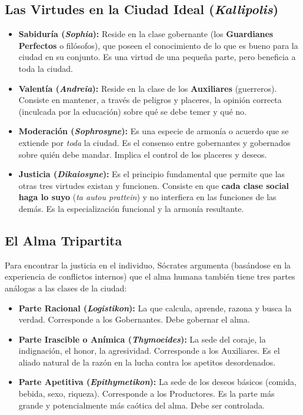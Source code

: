 \documentclass[11pt, a4paper]{article}
\begin{document}
\subsection*{Las Virtudes en la Ciudad Ideal (\textit{Kallipolis})}
\begin{itemize}
    \item \textbf{Sabiduría (\textit{Sophia}):} Reside en la clase gobernante (los \textbf{Guardianes Perfectos} o filósofos), que poseen el conocimiento de lo que es bueno para la ciudad en su conjunto. Es una virtud de una pequeña parte, pero beneficia a toda la ciudad.
    \item \textbf{Valentía (\textit{Andreia}):} Reside en la clase de los \textbf{Auxiliares} (guerreros). Consiste en mantener, a través de peligros y placeres, la opinión correcta (inculcada por la educación) sobre qué se debe temer y qué no.
    \item \textbf{Moderación (\textit{Sophrosyne}):} Es una especie de armonía o acuerdo que se extiende por \textit{toda} la ciudad. Es el consenso entre gobernantes y gobernados sobre quién debe mandar. Implica el control de los placeres y deseos.
    \item \textbf{Justicia (\textit{Dikaiosyne}):} Es el principio fundamental que permite que las otras tres virtudes existan y funcionen. Consiste en que \textbf{cada clase social haga lo suyo} (\textit{ta autou prattein}) y no interfiera en las funciones de las demás. Es la especialización funcional y la armonía resultante.
\end{itemize}

\subsection*{El Alma Tripartita}
Para encontrar la justicia en el individuo, Sócrates argumenta (basándose en la experiencia de conflictos internos) que el alma humana también tiene tres partes análogas a las clases de la ciudad:
\begin{itemize}
    \item \textbf{Parte Racional (\textit{Logistikon}):} La que calcula, aprende, razona y busca la verdad. Corresponde a los Gobernantes. Debe gobernar el alma.
    \item \textbf{Parte Irascible o Anímica (\textit{Thymoeides}):} La sede del coraje, la indignación, el honor, la agresividad. Corresponde a los Auxiliares. Es el aliado natural de la razón en la lucha contra los apetitos desordenados.
    \item \textbf{Parte Apetitiva (\textit{Epithymetikon}):} La sede de los deseos básicos (comida, bebida, sexo, riqueza). Corresponde a los Productores. Es la parte más grande y potencialmente más caótica del alma. Debe ser controlada.
\end{itemize}
\end{document}
